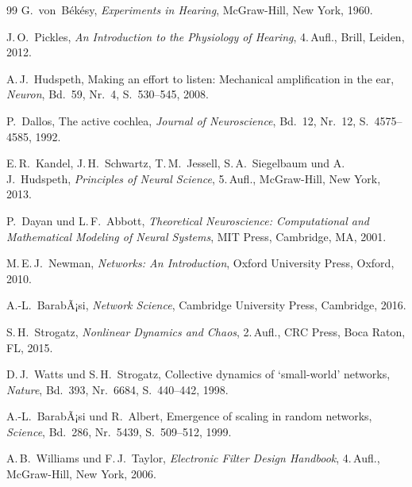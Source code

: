 ﻿\documentclass[a4paper,12pt]{report}
\theoremstyle{definition}
\begin{document}
\begin{thebibliography}{99}
G.~von~Békésy,
\textit{Experiments in Hearing},
McGraw-Hill, New York, 1960.

J.\,O.~Pickles,
\textit{An Introduction to the Physiology of Hearing},
4.\,Aufl., Brill, Leiden, 2012.

A.\,J.~Hudspeth,
Making an effort to listen: Mechanical amplification in the ear,
\textit{Neuron}, Bd.~59, Nr.~4, S.~530--545, 2008.

P.~Dallos,
The active cochlea,
\textit{Journal of Neuroscience}, Bd.~12, Nr.~12, S.~4575--4585, 1992.

E.\,R.~Kandel, J.\,H.~Schwartz, T.\,M.~Jessell, S.\,A.~Siegelbaum und A.\,J.~Hudspeth,
\textit{Principles of Neural Science},
5.\,Aufl., McGraw-Hill, New York, 2013.

P.~Dayan und L.\,F.~Abbott,
\textit{Theoretical Neuroscience: Computational and Mathematical Modeling of Neural Systems},
MIT Press, Cambridge, MA, 2001.

M.\,E.\,J.~Newman,
\textit{Networks: An Introduction},
Oxford University Press, Oxford, 2010.

A.-L.~BarabÃ¡si,
\textit{Network Science},
Cambridge University Press, Cambridge, 2016.

S.\,H.~Strogatz,
\textit{Nonlinear Dynamics and Chaos},
2.\,Aufl., CRC Press, Boca Raton, FL, 2015.

D.\,J.~Watts und S.\,H.~Strogatz,
Collective dynamics of `small-world' networks,
\textit{Nature}, Bd.~393, Nr.~6684, S.~440--442, 1998.

A.-L.~BarabÃ¡si und R.~Albert,
Emergence of scaling in random networks,
\textit{Science}, Bd.~286, Nr.~5439, S.~509--512, 1999.

A.\,B.~Williams und F.\,J.~Taylor,
\textit{Electronic Filter Design Handbook},
4.\,Aufl., McGraw-Hill, New York, 2006.


\end{thebibliography}
\end{document}
